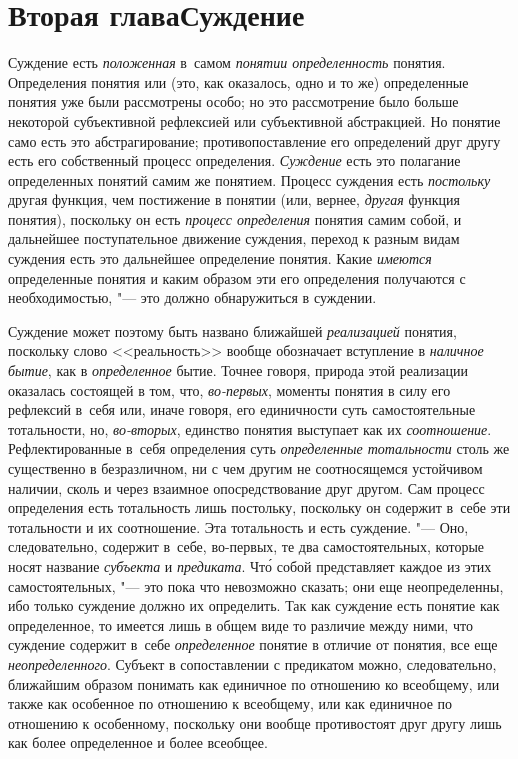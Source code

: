 \chapter[Вторая глава. Суждение]{Вторая глава\newline Суждение}

Суждение есть {\em положенная} в~самом {\em понятии определенность}
понятия. Определения понятия или (это, как оказалось, одно и
то же) определенные понятия уже были рассмотрены особо; но это рассмотрение
было больше некоторой субъективной рефлексией или субъективной абстракцией.
Но понятие само есть это абстрагирование; противопоставление его
определений друг другу есть его собственный процесс определения. {\em Суждение}
есть это полагание определенных понятий самим же понятием. Процесс суждения
есть {\em постольку} другая функция, чем постижение в понятии (или, вернее,
{\em другая} функция понятия), поскольку он есть {\em процесс
определения} понятия самим собой, и дальнейшее
поступательное движение суждения, переход к разным видам
суждения есть это дальнейшее определение понятия. Какие {\em имеются}
определенные понятия и каким образом эти его определения
получаются с необходимостью, "--- это должно обнаружиться в суждении.

Суждение может поэтому быть названо ближайшей {\em реализацией}
понятия, поскольку слово <<реальность>> вообще обозначает
вступление в {\em наличное бытие}, как в {\em определенное}
бытие. Точнее говоря, природа этой реализации оказалась
состоящей в том, что, {\em во-первых},
моменты понятия в силу его рефлексий в~себя или, иначе
говоря, его единичности суть самостоятельные тотальности, но,
{\em во-вторых}, единство понятия выступает как их {\em соотношение}.
Рефлектированные в~себя определения суть {\em определенные тотальности}
столь же существенно в безразличном, ни с чем другим не
соотносящемся устойчивом наличии, сколь и через взаимное опосредствование
друг другом. Сам процесс определения есть тотальность лишь постольку,
поскольку он содержит в~себе эти тотальности и их соотношение. Эта
тотальность и есть суждение. "--- Оно, следовательно, содержит
в~себе, во-первых, те два самостоятельных, которые носят название
{\em субъекта} и {\em предиката}. Чт\'{о}
собой представляет каждое из этих самостоятельных, "--- это
пока что невозможно сказать; они еще неопределенны, ибо только суждение
должно их определить. Так как суждение есть понятие как определенное, то
имеется лишь в общем виде то различие между ними, что суждение содержит
в~себе {\em определенное} понятие в отличие от понятия, все еще
{\em неопределенного}. Субъект в сопоставлении с предикатом можно,
следовательно, ближайшим образом понимать как единичное по отношению ко
всеобщему, или также как особенное по отношению к всеобщему, или как
единичное по отношению к особенному, поскольку они вообще противостоят
друг другу лишь как более определенное и более всеобщее.

